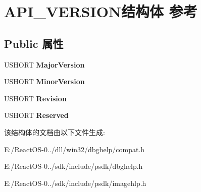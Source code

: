 \hypertarget{struct_a_p_i___v_e_r_s_i_o_n}{}\section{A\+P\+I\+\_\+\+V\+E\+R\+S\+I\+O\+N结构体 参考}
\label{struct_a_p_i___v_e_r_s_i_o_n}
\subsection*{Public 属性}
\begin{DoxyCompactItemize}
\item 
\mbox{\label{struct_a_p_i___v_e_r_s_i_o_n_a5829c5ff1251e4bedd2d8bce6d81e0ad}} 
U\+S\+H\+O\+RT {\bfseries Major\+Version}
\item 
\mbox{\label{struct_a_p_i___v_e_r_s_i_o_n_ac8c5184413300cd266a35a689db22c4d}} 
U\+S\+H\+O\+RT {\bfseries Minor\+Version}
\item 
\mbox{\label{struct_a_p_i___v_e_r_s_i_o_n_a6f2886709495cb267fc7bb57104b07d7}} 
U\+S\+H\+O\+RT {\bfseries Revision}
\item 
\mbox{\label{struct_a_p_i___v_e_r_s_i_o_n_a9219fb3bdf3fc65be480a46bfcd26eb4}} 
U\+S\+H\+O\+RT {\bfseries Reserved}
\end{DoxyCompactItemize}


该结构体的文档由以下文件生成\+:\begin{DoxyCompactItemize}
\item 
E\+:/\+React\+O\+S-\/0../dll/win32/dbghelp/compat.\+h\item 
E\+:/\+React\+O\+S-\/0../sdk/include/psdk/dbghelp.\+h\item 
E\+:/\+React\+O\+S-\/0../sdk/include/psdk/imagehlp.\+h\end{DoxyCompactItemize}
